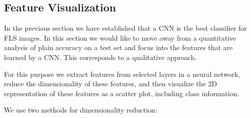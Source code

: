 \subsection{Feature Visualization}

In the previous section we have established that a CNN is the best classifier for FLS images. In this section we would like to move away from a quantitative analysis of plain accuracy on a test set and focus into the features that are learned by a CNN. This corresponds to a qualitative approach.

For this purpose we extract features from selected layers in a neural network, reduce the dimensionality of these features, and then visualize the 2D representation of these features as a scatter plot, including class information.

We use two methods for dimensionality reduction:

